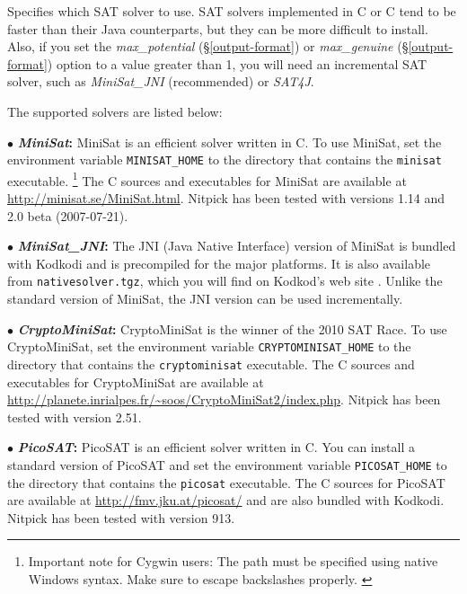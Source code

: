 \documentclass[a4paper,12pt]{article}
\begin{document}
\def\cpp{C\nobreak\raisebox{.1ex}{+}\nobreak\raisebox{.1ex}{+}}

\sloppy

\begin{enum}
Specifies which SAT solver to use. SAT solvers implemented in C or \cpp{} tend
to be faster than their Java counterparts, but they can be more difficult to
install. Also, if you set the \textit{max\_potential} (\S\ref{output-format}) or
\textit{max\_genuine} (\S\ref{output-format}) option to a value greater than 1,
you will need an incremental SAT solver, such as \textit{MiniSat\_JNI}
(recommended) or \textit{SAT4J}.

The supported solvers are listed below:

\begin{enum}

\item[$\bullet$] \textbf{\textit{MiniSat}:} MiniSat is an efficient solver
written in \cpp{}. To use MiniSat, set the environment variable
\texttt{MINISAT\_HOME} to the directory that contains the \texttt{minisat}
executable.%
\footnote{Important note for Cygwin users: The path must be specified using
native Windows syntax. Make sure to escape backslashes properly.%
\label{cygwin-paths}}
The \cpp{} sources and executables for MiniSat are available at
\url{http://minisat.se/MiniSat.html}. Nitpick has been tested with versions 1.14
and 2.0 beta (2007-07-21).

\item[$\bullet$] \textbf{\textit{MiniSat\_JNI}:} The JNI (Java Native Interface)
version of MiniSat is bundled with Kodkodi and is precompiled for the major
platforms. It is also available from \texttt{native\-solver.\allowbreak tgz},
which you will find on Kodkod's web site \cite{kodkod-2009}. Unlike the standard
version of MiniSat, the JNI version can be used incrementally.

\item[$\bullet$] \textbf{\textit{CryptoMiniSat}:} CryptoMiniSat is the winner of
the 2010 SAT Race. To use CryptoMiniSat, set the environment variable
\texttt{CRYPTO\-MINISAT\_}\discretionary{}{}{}\texttt{HOME} to the directory that contains the \texttt{crypto\-minisat}
executable.%
The \cpp{} sources and executables for Crypto\-Mini\-Sat are available at
\url{http://planete.inrialpes.fr/~soos/}\allowbreak\url{CryptoMiniSat2/index.php}.
Nitpick has been tested with version 2.51.

\item[$\bullet$] \textbf{\textit{PicoSAT}:} PicoSAT is an efficient solver
written in C. You can install a standard version of
PicoSAT and set the environment variable \texttt{PICOSAT\_HOME} to the directory
that contains the \texttt{picosat} executable.%
The C sources for PicoSAT are
available at \url{http://fmv.jku.at/picosat/} and are also bundled with Kodkodi.
Nitpick has been tested with version 913.


\end{enum}
\end{enum}
\end{document}

